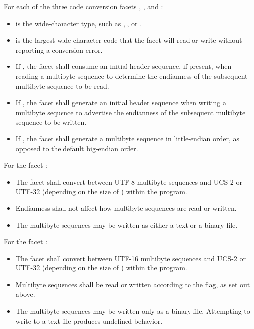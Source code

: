 \pnum
For each of the three code conversion facets ,
, and :
\begin{itemize}
\item
   is the wide-character type, such as
  , , or .
\item
   is the largest wide-character code that the facet
  will read or write without reporting a conversion error.
\item
  If , the facet shall consume an
  initial header sequence, if present, when reading a multibyte sequence
  to determine the endianness of the subsequent multibyte sequence to be read.
\item
  If , the facet shall generate an
  initial header sequence when writing a multibyte sequence to advertise
  the endianness of the subsequent multibyte sequence to be written.
\item
  If , the facet shall generate a
  multibyte sequence in little-endian order,
  as opposed to the default big-endian order.
\end{itemize}

\pnum
For the facet :
\begin{itemize}
\item
  The facet shall convert between UTF-8 multibyte sequences
  and UCS-2 or UTF-32 (depending on the size of )
  within the program.
\item
  Endianness shall not affect how multibyte sequences are read or written.
\item
  The multibyte sequences may be written as either a text or a binary file.
\end{itemize}

\pnum
For the facet :
\begin{itemize}
\item
  The facet shall convert between UTF-16 multibyte sequences
  and UCS-2 or UTF-32 (depending on the size of )
  within the program.
\item
  Multibyte sequences shall be read or written
  according to the  flag, as set out above.
\item
  The multibyte sequences may be written only as a binary file.
  Attempting to write to a text file produces undefined behavior.
\end{itemize}

